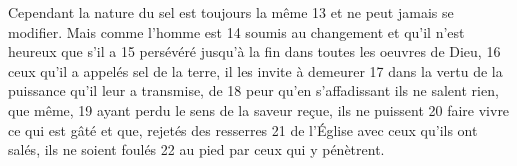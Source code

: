 Cependant la nature du sel est toujours la même	 
13	 	et ne peut jamais se modifier. Mais comme l'homme est	 
14	 	soumis au changement et qu'il n'est heureux que s'il a	 
15	 	persévéré jusqu'à la fin dans toutes les oeuvres de Dieu,	 
16	 	ceux qu'il a appelés sel de la terre, il les invite à demeurer	 
17	 	dans la vertu de la puissance qu'il leur a transmise, de	 
18	 	peur qu'en s'affadissant ils ne salent rien, que même,	 
19	 	ayant perdu le sens de la saveur reçue, ils ne puissent	 
20	 	faire vivre ce qui est gâté et que, rejetés des resserres	 
21	 	de l'Église avec ceux qu'ils ont salés, ils ne soient foulés	 
22	 	au pied par ceux qui y pénètrent.